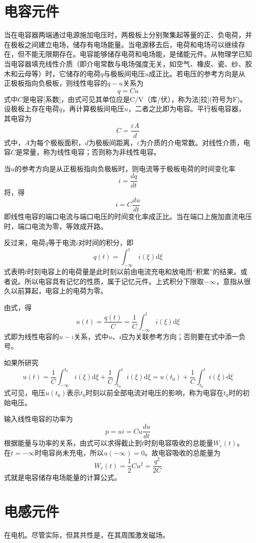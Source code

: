 \section{电容元件}
当在电容器两端通过电源施加电压时，两极板上分别聚集起等量的正、负电荷，并在极板之间建立电场，储存有电场能量。当电源移去后，电荷和电场可以继续存在，但不能无限期存在。电容能够储存电荷和电场能，是储能元件。从物理学已知当电容器填充线性介质（即介电常数与电场强度无关，如空气、橡皮、瓷、纱、胶木和云母等）时，它储存的电荷$q$与极板间电压$u$成正比。若电压的参考方向是从正极板指向负极板，则线性电容的$q-u$关系为
\[
q=Cu
\]
式中$C$是电容[系数]，由式可见其单位应是$\mathrm{C/V}$（库/伏），称为法[拉](符号为$\mathrm{F}$)。设极板上存在电荷$q$，再计算极板间电压$u$，二者之比即为电容。平行板电容器，其电容为
\[
C=\frac{\varepsilon A}{d}
\]
式中，$A$为每个极板面积，$d$为极板间距离，$\varepsilon$为介质的介电常数。对线性介质，电容$C$是常量，称为线性电容；否则称为非线性电容。

当$u$的参考方向是从正极板指向负极板时，则电流等于极板电荷的时间变化率
\[
i=\frac{dq}{dt}
\]
将，得
\[
i=C\frac{du}{dt}
\]
即线性电容的端口电流与端口电压的时间变化率成正比。当在端口上施加直流电压时，端口电流为零，等效成开路。

反过来，电荷$q$等于电流$i$对时间的积分，即
\[
q(t)=\int_{-\infty}^t i(\xi)\mathrm{d}\xi
\]
式表明$t$时刻电容上的电荷量是此时刻以前由电流充电和放电而“积累”的结果。或者说。所以电容具有记忆的性质，属于记忆元件。上式积分下限取$-\infty$，意指从很久以前算起，电容上的电荷为零。

由式，得
\[
u(t)=\frac{q(t)}{C}=\frac{1}{C}\int_{-\infty}^t i(\xi)\mathrm{d}\xi
\]
式即为线性电容的$u-i$关系，式中$u、i$应为关联参考方向；否则要在式中添一负号。

如果所研究
\[
u(t)=\frac{1}{C}\int_{-\infty}^{t_0}i(\xi)\mathrm{d}\xi+\frac{1}{C}\int_{t_0}^t i(\xi)\mathrm{d}\xi
=u(t_0)+\frac{1}{C}\int_{t_0}^t i(\xi)\mathrm{d}\xi
\]
式可见，电压$u(t_0)$表示$t_0$时刻以前全部电流对电压的影响，称为电容在$t_0$时的初始电压。

输入线性电容的功率为
\[
p=ui=Cu\frac{du}{dt}
\]
根据能量与功率的关系，由式可以求得截止到$t$时刻电容吸收的总能量$W_e(t)$。
在$t=-\infty$时电容尚未充电，所以$u(-\infty)=0$。故电容吸收的总能量为
\[
W_e(t)=\frac{1}{2}Cu^2=\frac{q^2}{2C}
\]
式就是电容储存电场能量的计算公式。

\section{电感元件}
在电机。尽管实际，但其共性是，在其周围激发磁场。

